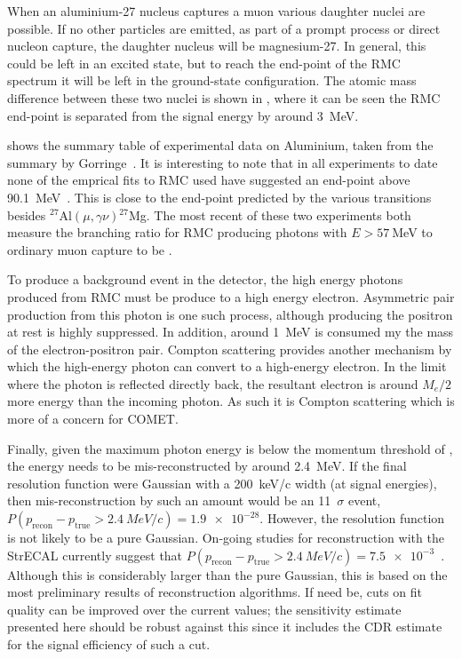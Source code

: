 When an aluminium-27 nucleus captures a muon various daughter nuclei are possible.
If no other particles are emitted, as part of a prompt process or direct nucleon capture, the daughter nucleus will be magnesium-27.
In general, this could be left in an excited state, but to reach the end-point of the \ac{RMC} spectrum it will be left in the ground-state configuration.
The atomic mass difference between these two nuclei is shown in , where it can be seen the RMC end-point is separated from the \mueconv signal energy by around 3~MeV.

\FigRMCExperiments

 shows the summary table of experimental data on Aluminium, taken from the summary by Gorringe~\cite{RevModPhys.76.31}.
It is interesting to note that in all experiments to date none of the emprical fits to RMC used have suggested an end-point above 90.1~MeV~\cite{PhysRevC.37.1633,PhysRevC.46.1094,PhysRevC.59.2853}.
This is close to the end-point predicted by the various transitions besides ${}^{27}$Al$(\mu,\gamma\nu){}^{27}$Mg.
The most recent of these two experiments both measure the branching ratio for \ac{RMC} producing photons with $E>57~$MeV to ordinary muon capture to be . 

To produce a background event in the detector, the high energy photons produced from RMC must be produce to a high energy electron.
Asymmetric pair production from this photon is one such process, although producing the positron at rest is highly suppressed.
In addition, around 1~MeV is consumed my the mass of the electron-positron pair.
Compton scattering provides another mechanism by which the high-energy photon can convert to a high-energy electron.
In the limit where the photon is reflected directly back, the resultant electron is around $M_e/2$ more energy than the incoming photon.
As such it is Compton scattering which is more of a concern for COMET.

Finally, given the maximum photon energy is below the momentum threshold of \VarMomThreshold, the energy needs to be mis-reconstructed by around 2.4~MeV.
If the final resolution function were Gaussian with a 200~keV/c width (at signal energies), then mis-reconstruction by such an amount would be an 11~$\sigma$ event, \ie $P(p_\textrm{recon}-p_\textrm{true}>\SI{2.4}{MeV/c})=\num{1.9e-28}$.
However, the resolution function is not likely to be a pure Gaussian.
On-going studies for reconstruction with the  \phaseI StrECAL currently suggest that $P(p_\textrm{recon}-p_\textrm{true}>\SI{2.4}{MeV/c})=\num{7.5e-3}$~\cite{YFujiiStrECALRecon}.
Although this is considerably larger than the pure Gaussian, this is based on the most preliminary results of reconstruction algorithms.
If need be, cuts on fit quality can be improved over the current \phaseI values; the sensitivity estimate presented here should be robust against this since it includes the CDR estimate for the signal efficiency of such a cut.


